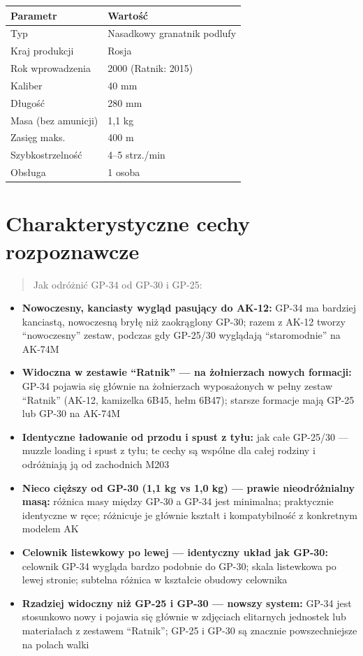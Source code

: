 \documentclass[12pt,openany,oneside]{book}
\providecommand{\tightlist}{%
  \setlength{\itemsep}{0pt}\setlength{\parskip}{0pt}}
\begin{document}
\begin{longtable}[]{@{}ll@{}}
\toprule\noalign{}
Parametr & Wartość \\
\midrule\noalign{}
\endhead
\bottomrule\noalign{}
\endlastfoot
Typ & Nasadkowy granatnik podlufy \\
Kraj produkcji & Rosja \\
Rok wprowadzenia & 2000 (Ratnik: 2015) \\
Kaliber & 40 mm \\
Długość & 280 mm \\
Masa (bez amunicji) & 1,1 kg \\
Zasięg maks. & 400 m \\
Szybkostrzelność & 4--5 strz./min \\
Obsługa & 1 osoba \\
\end{longtable}

\section{Charakterystyczne cechy
rozpoznawcze}\label{charakterystyczne-cechy-rozpoznawcze-81}

\begin{quote}
Jak odróżnić GP-34 od GP-30 i GP-25:
\end{quote}

\begin{itemize}
\tightlist
\item
  \textbf{Nowoczesny, kanciasty wygląd pasujący do AK-12:} GP-34 ma
  bardziej kanciastą, nowoczesną bryłę niż zaokrąglony GP-30; razem z
  AK-12 tworzy ``nowoczesny'' zestaw, podczas gdy GP-25/30 wyglądają
  ``staromodnie'' na AK-74M
\item
  \textbf{Widoczna w zestawie ``Ratnik'' --- na żołnierzach nowych
  formacji:} GP-34 pojawia się głównie na żołnierzach wyposażonych w
  pełny zestaw ``Ratnik'' (AK-12, kamizelka 6B45, hełm 6B47); starsze
  formacje mają GP-25 lub GP-30 na AK-74M
\item
  \textbf{Identyczne ładowanie od przodu i spust z tyłu:} jak całe
  GP-25/30 --- muzzle loading i spust z tyłu; te cechy są wspólne dla
  całej rodziny i odróżniają ją od zachodnich M203
\item
  \textbf{Nieco cięższy od GP-30 (1,1 kg vs 1,0 kg) --- prawie
  nieodróżnialny masą:} różnica masy między GP-30 a GP-34 jest
  minimalna; praktycznie identyczne w ręce; różnicuje je głównie kształt
  i kompatybilność z konkretnym modelem AK
\item
  \textbf{Celownik listewkowy po lewej --- identyczny układ jak GP-30:}
  celownik GP-34 wygląda bardzo podobnie do GP-30; skala listewkowa po
  lewej stronie; subtelna różnica w kształcie obudowy celownika
\item
  \textbf{Rzadziej widoczny niż GP-25 i GP-30 --- nowszy system:} GP-34
  jest stosunkowo nowy i pojawia się głównie w zdjęciach elitarnych
  jednostek lub materiałach z zestawem ``Ratnik''; GP-25 i GP-30 są
  znacznie powszechniejsze na polach walki
\end{itemize}
\end{document}
